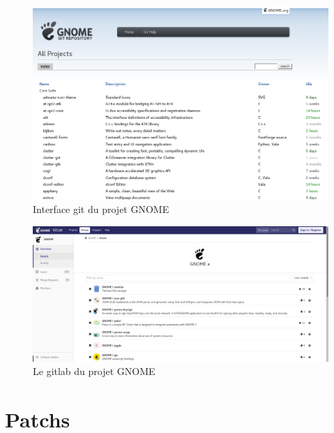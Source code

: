\documentclass[12pt]{report}
\begin{document}
\begin{figure}[p]
  \caption{\label{figure_cgit} Interface git du projet GNOME}
  \includegraphics[width=15cm]{images/git_gnome_org.png}
\end{figure}

\begin{figure}[p]
  \caption{\label{figure_gitlab} Le gitlab du projet GNOME}
  \includegraphics[width=15cm]{images/gitlab_gnome_org.png}
\end{figure}

\chapter{Patchs} 
\end{document}
